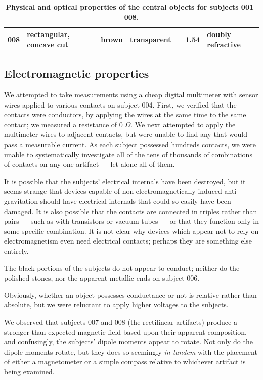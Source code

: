 \documentclass[10pt]{article}
\theoremstyle{definition}
\begin{document}
\begin{table}
{\begin{tabular}{lp{5em}rrrrp{7.5em}}
\textbf{008}                                & rectangular, concave cut           & brown                                      & transparent                               &  & 1.54                                          & doubly refractive                            \\ \hline
\end{tabular}}
\caption{\label{tab:optical}\textbf{Physical and optical properties of the central objects for subjects 001--008.}}
\end{table}

\subsection{Electromagnetic properties}
We attempted to take measurements using a cheap digital multimeter with sensor wires applied to various contacts on subject 004.
First, we verified that the contacts were conductors, by applying the wires at the same time to the same contact; we measured a resistance of 0 $\Omega$.
We next attempted to apply the multimeter wires to adjacent contacts, but were unable to find any that would pass a measurable current.
As each subject possessed hundreds contacts, we were unable to systematically investigate all of the tens of thousands of combinations of contacts on any one artifact --- let alone all of them. 

It is possible that the subjects' electrical internals have been destroyed, but it seems strange that devices capable of non-electromagnetically-induced anti-gravitation should have electrical internals that could so easily have been damaged.
It is also possible that the contacts are connected in triples rather than pairs --- such as with transistors or vacuum tubes --- or that they function only in some specific combination.
It is not clear why devices which appear not to rely on electromagnetism even need electrical contacts; perhaps they are something else entirely.

The black portions of the subjects do not appear to conduct; neither do the polished stones, nor the apparent metallic ends on subject 006.

Obviously, whether an object possesses conductance or not is relative rather than absolute, but we were reluctant to apply higher voltages to the subjects.

We observed that subjects 007 and 008 (the rectilinear artifacts) produce a stronger than expected magnetic field based upon their apparent composition, and confusingly, the subjects' dipole moments appear to rotate.
Not only do the dipole moments rotate, but they does so seemingly \textit{in tandem} with the placement of either a magnetometer or a simple compass relative to whichever artifact is being examined.
\end{document}
